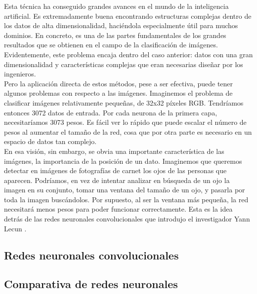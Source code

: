 Esta técnica ha conseguido grandes avances en el mundo de la inteligencia artificial. Es extremadamente buena encontrando estructuras complejas dentro de los datos de alta dimensionalidad, haciéndola especialmente útil para muchos dominios. En concreto, es una de las partes fundamentales de los grandes resultados que se obtienen en el campo de la clasificación de imágenes. Evidentemente, este problema encaja dentro del caso anterior: datos con una gran dimensionalidad y características complejas que eran necesarias diseñar por los ingenieros.\\

Pero la aplicación directa de estos métodos, pese a ser efectiva, puede tener algunos problemas con respecto a las imágenes. Imaginemos el problema de clasificar imágenes relativamente pequeñas, de 32x32 píxeles RGB. Tendríamos entonces 3072 datos de entrada. Por cada neurona de la primera capa, necesitaríamos 3073 pesos. Es fácil ver lo rápido que puede escalar el número de pesos al aumentar el tamaño de la red, cosa que por otra parte es necesario en un espacio de datos tan complejo.\\

En esa visión, sin embargo, se obvia una importante característica de las imágenes, la importancia de la posición de un dato. Imaginemos que queremos detectar en imágenes de fotografías de carnet los ojos de las personas que aparecen. Podríamos, en vez de intentar analizar en búsqueda de un ojo la imagen en su conjunto, tomar una ventana del tamaño de un ojo, y pasarla por toda la imagen buscándolos. Por supuesto, al ser la ventana más pequeña, la red necesitará menos pesos para poder funcionar correctamente. Esta es la idea detrás de las redes neuronales convolucionales que introdujo el investigador Yann Lecun \cite{lecun-89e}\cite{lecun-98}.\\ 

\subsection{Redes neuronales convolucionales}


\subsection{Comparativa de redes neuronales}
